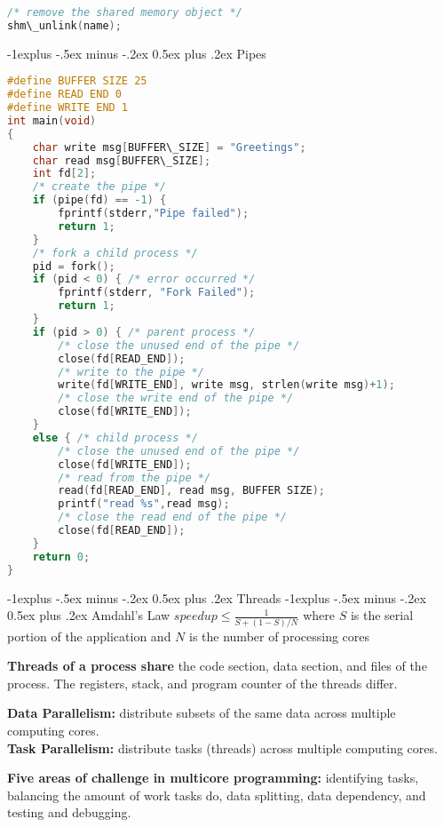\documentclass[letterpaper, 12pt]{extarticle}
\makeatletter
\renewcommand{\section}{\@startsection{section}{1}{0mm}%
                                {-1explus -.5ex minus -.2ex}%
                                {0.5ex plus .2ex}%
                                {\normalfont\normalsize\bfseries}}
\renewcommand{\subsection}{\@startsection{subsection}{2}{0mm}%
                                {-1explus -.5ex minus -.2ex}%
                                {0.5ex plus .2ex}%
                                {\normalfont\small\bfseries}}
\makeatother
\begin{document}
\begin{multicols*}{6}
\begin{lstlisting}[language=C]
/* remove the shared memory object */
shm\_unlink(name);
\end{lstlisting}

    \subsection{Pipes}
    \begin{lstlisting}[language=C]
#define BUFFER SIZE 25
#define READ END 0
#define WRITE END 1
int main(void)
{
    char write msg[BUFFER\_SIZE] = "Greetings";
    char read msg[BUFFER\_SIZE];
    int fd[2];
    /* create the pipe */
    if (pipe(fd) == -1) {
        fprintf(stderr,"Pipe failed");
        return 1;
    }
    /* fork a child process */
    pid = fork();
    if (pid < 0) { /* error occurred */
        fprintf(stderr, "Fork Failed");
        return 1;
    }
    if (pid > 0) { /* parent process */
        /* close the unused end of the pipe */
        close(fd[READ_END]);
        /* write to the pipe */
        write(fd[WRITE_END], write msg, strlen(write msg)+1);
        /* close the write end of the pipe */
        close(fd[WRITE_END]);
    }
    else { /* child process */
        /* close the unused end of the pipe */
        close(fd[WRITE_END]);
        /* read from the pipe */
        read(fd[READ_END], read msg, BUFFER SIZE);
        printf("read %s",read msg);
        /* close the read end of the pipe */
        close(fd[READ_END]);
    }
    return 0;
}
\end{lstlisting}
    \section{Threads}
    \subsection{Amdahl's Law}
    $speedup \leq \frac{1}{S+(1-S)/N}$ where $S$ is the serial
    portion of the application and $N$ is the number of processing cores

    \textbf{Threads of a process share} the code section, data section, and files
    of the process. The registers, stack, and program counter of the threads
    differ.

    \textbf{Data Parallelism:} distribute subsets of the same data across multiple
    computing cores. \\
    \textbf{Task Parallelism:} distribute tasks (threads) across multiple
    computing cores.

    \textbf{Five areas of challenge in multicore programming:} identifying tasks,
    balancing the amount of work tasks do, data splitting, data dependency, 
    and testing and debugging. 


\end{multicols*}
\end{document}
